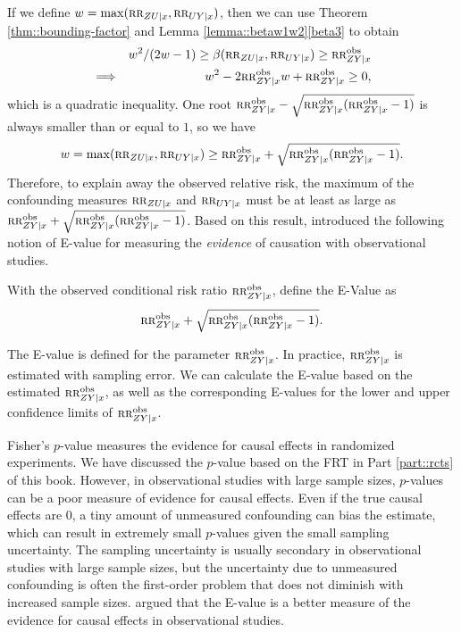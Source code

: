 If we define $w = \max( \textsc{rr}_{ZU\mid x} ,  \textsc{rr}_{UY\mid x} )$, then we can use Theorem \ref{thm::bounding-factor} and Lemma \ref{lemma::betaw1w2}\eqref{beta3} to obtain
\begin{eqnarray*}
&&w^2/(2w-1) \geq \beta( \textsc{rr}_{ZU\mid x} , \textsc{rr}_{UY\mid x}) \geq \textsc{rr}_{ZY\mid x}^{\textup{obs}} \\ 
&\Longrightarrow & w^2 - 2 \textsc{rr}_{ZY\mid x}^{\textup{obs}} w + \textsc{rr}_{ZY\mid x}^{\textup{obs}} \geq 0,
\end{eqnarray*}
which is a quadratic inequality. One root $  \textsc{rr}_{ZY\mid x}^{\textup{obs}} - \sqrt{ \textsc{rr}_{ZY\mid x}^{\textup{obs}} (\textsc{rr}_{ZY\mid x}^{\textup{obs}} - 1)} $ is always smaller than or equal to $1$, so we have
$$
w = \max( \textsc{rr}_{ZU\mid x} ,  \textsc{rr}_{UY\mid x} ) \geq \textsc{rr}_{ZY\mid x}^{\textup{obs}} + \sqrt{ \textsc{rr}_{ZY\mid x}^{\textup{obs}} (\textsc{rr}_{ZY\mid x}^{\textup{obs}} - 1)} . 
$$
Therefore, to explain away the observed relative risk, the maximum of the confounding measures $\textsc{rr}_{ZU\mid x} $ and $  \textsc{rr}_{UY\mid x}$ must be at least as large as $\textsc{rr}_{ZY\mid x}^{\textup{obs}} + \sqrt{ \textsc{rr}_{ZY\mid x}^{\textup{obs}} (\textsc{rr}_{ZY\mid x}^{\textup{obs}} - 1)} $.  
Based on this result, \citet{vanderweele2017sensitivity} introduced the following notion of  E-value for measuring the {\it evidence} of causation with observational studies. 

 


\begin{definition}
[E-Value]
With the observed conditional risk ratio $\textsc{rr}_{ZY\mid x}^{\textup{obs}}$, define the E-Value as 
$$
\textsc{rr}_{ZY\mid x}^{\textup{obs}} + \sqrt{ \textsc{rr}_{ZY\mid x}^{\textup{obs}} (\textsc{rr}_{ZY\mid x}^{\textup{obs}} - 1)} . 
$$ 
\end{definition}

 
 
The E-value is defined for the parameter  $\textsc{rr}_{ZY\mid x}^{\textup{obs}}$. In practice, $\textsc{rr}_{ZY\mid x}^{\textup{obs}}$ is estimated with sampling error. We can calculate the E-value based on the estimated $\textsc{rr}_{ZY\mid x}^{\textup{obs}}$, as well as the corresponding E-values for the lower and upper confidence limits of $\textsc{rr}_{ZY\mid x}^{\textup{obs}}$. 


Fisher's $p$-value measures the evidence for causal effects in randomized experiments. We have discussed the $p$-value based on the FRT in Part \ref{part::rcts} of this book. However, in observational studies with large sample sizes, $p$-values can be a poor measure of evidence for causal effects. Even if the true causal effects are $0$, a tiny amount of unmeasured confounding can bias the estimate, which can result in extremely small $p$-values given the small sampling uncertainty. The sampling uncertainty is usually secondary in observational studies with large sample sizes, but the uncertainty due to unmeasured confounding is often the first-order problem that does not diminish with increased sample sizes.  \citet{vanderweele2017sensitivity} argued that the E-value is a better measure of the evidence for causal effects in observational studies. 

